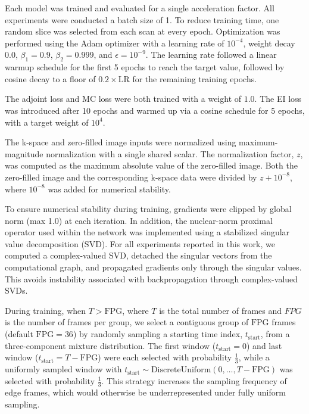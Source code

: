 \documentclass[runningheads]{llncs}
\begin{document}
Each model was trained and evaluated for a single acceleration factor. All experiments were conducted a batch size of 1. To reduce training time, one random slice was selected from each scan at every epoch. Optimization was performed using the Adam optimizer with a learning rate of $10^{-4}$, weight decay $0.0$, $\beta_1 = 0.9$, $\beta_2 = 0.999$, and $\epsilon = 10^{-9}$. The learning rate followed a linear warmup schedule for the first 5 epochs to reach the target value, followed by cosine decay to a floor of $0.2 \times \mathrm{LR}$ for the remaining training epochs. 

The adjoint loss and MC loss were both trained with a weight of $1.0$. The EI loss was introduced after 10 epochs and warmed up via a cosine schedule for 5 epochs, with a target weight of $10^4$. 

The k-space and zero-filled image inputs were normalized using maximum-magnitude normalization with a single shared scalar. The normalization factor, $z$, was computed as the maximum absolute value of the zero-filled image. Both the zero-filled image and the corresponding k-space data were divided by $z + 10^{-8}$, where $10^{-8}$ was added for numerical stability.

To ensure numerical stability during training, gradients were clipped by global norm (max 1.0) at each iteration. In addition, the nuclear-norm proximal operator used within the network was implemented using a stabilized singular value decomposition (SVD). For all experiments reported in this work, we computed a complex-valued SVD, detached the singular vectors from the computational graph, and propagated gradients only through the singular values. This avoids instability associated with backpropagation through complex-valued SVDs.

During training, when $T > \mathrm{FPG}$, where $T$ is the total number of frames and $FPG$ is the number of frames per group, we select a contiguous group of $\mathrm{FPG}$ frames (default $\mathrm{FPG} = 36$) by randomly sampling a starting time index, $t_\text{start}$, from a three-component mixture distribution. The first window ($t_{\mathrm{start}} = 0$) and last window ($t_{\mathrm{start}} = T - \mathrm{FPG}$) were each selected with probability $\frac{1}{3}$, while a uniformly sampled window with $t_{\mathrm{start}} \sim \mathrm{DiscreteUniform}(0, \ldots, T - \mathrm{FPG})$ was selected with probability $\frac{1}{3}$. This strategy increases the sampling frequency of edge frames, which would otherwise be underrepresented under fully uniform sampling. 
\end{document}

